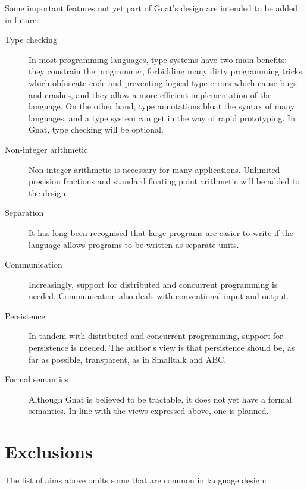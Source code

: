 \documentclass[english]{article}
\begin{document}
Some important features not yet part of Gnat's design are intended to be added in future:

\begin{description}
\item[Type checking]In most programming languages, type systems have two main benefits: they constrain the programmer, forbidding many dirty programming tricks which obfuscate code and preventing logical type errors which cause bugs and crashes, and they allow a more efficient implementation of the language. On the other hand, type annotations bloat the syntax of many languages, and a type system can get in the way of rapid prototyping. In Gnat, type checking will be optional.
\item[Non-integer arithmetic]Non-integer arithmetic is necessary for many applications. Unlimited-precision fractions and standard floating point arithmetic will be added to the design.
\item[Separation]It has long been recognised that large programs are easier to write if the language allows programs to be written as separate units.
\item[Communication]Increasingly, support for distributed and concurrent programming is needed. Communication also deals with conventional input and output.
\item[Persistence]In tandem with distributed and concurrent programming, support for persistence is needed. The author's view is that persistence should be, as far as possible, transparent, as in Smalltalk and ABC.
\item[Formal semantics]Although Gnat is believed to be tractable, it does not yet have a formal semantics. In line with the views expressed above, one is planned.
\end{description}



\section{Exclusions}

The list of aims above omits some that are common in language design:
\end{document}
